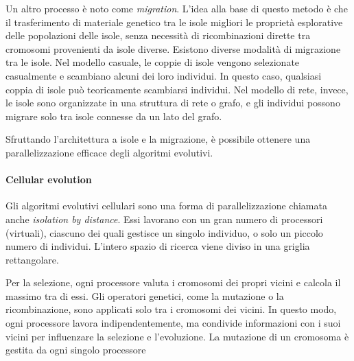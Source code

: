 Un altro processo è noto come \textit{migration}. L'idea alla base di questo metodo è che il trasferimento di materiale genetico tra le isole migliori le proprietà esplorative delle popolazioni delle isole, senza necessità di ricombinazioni dirette tra cromosomi provenienti da isole diverse.
Esistono diverse modalità di migrazione tra le isole. Nel modello casuale, le coppie di isole vengono selezionate casualmente e scambiano alcuni dei loro individui. In questo caso, qualsiasi coppia di isole può teoricamente scambiarsi individui. Nel modello di rete, invece, le isole sono organizzate in una struttura di rete o grafo, e gli individui possono migrare solo tra isole connesse da un lato del grafo.

Sfruttando l'architettura a isole e la migrazione, è possibile ottenere una parallelizzazione efficace degli algoritmi evolutivi.

\paragraph{Cellular evolution}
Gli algoritmi evolutivi cellulari sono una forma di parallelizzazione chiamata anche \textit{isolation by distance}. Essi lavorano con un gran numero di processori (virtuali), ciascuno dei quali gestisce un singolo individuo, o solo un piccolo numero di individui. L'intero spazio di ricerca viene diviso in una griglia rettangolare.

Per la selezione, ogni processore valuta i cromosomi dei propri vicini e calcola il massimo tra di essi. Gli operatori genetici, come la mutazione o la ricombinazione, sono applicati solo tra i cromosomi dei vicini. In questo modo, ogni processore lavora indipendentemente, ma condivide informazioni con i suoi vicini per influenzare la selezione e l'evoluzione. La mutazione di un cromosoma è gestita da ogni singolo processore

\newpage